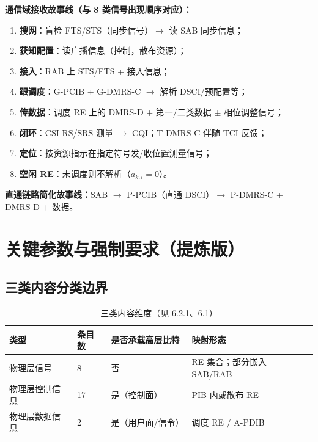 \documentclass[11pt,a4paper]{ctexart}
\begin{document}
\textbf{通信域接收故事线（与 8 类信号出现顺序对应）：}
\begin{enumerate}[nosep]
  \item \textbf{搜网}：盲检 FTS/STS（同步信号）$\rightarrow$ 读 SAB 同步信息；
  \item \textbf{获知配置}：读广播信息（控制，散布资源）；
  \item \textbf{接入}：RAB 上 STS/FTS + 接入信息；
  \item \textbf{跟调度}：G-PCIB + G-DMRS-C $\rightarrow$ 解析 DSCI/预配置等；
  \item \textbf{传数据}：调度 RE 上的 DMRS-D + 第一/二类数据 $\pm$ 相位调整信号；
  \item \textbf{闭环}：CSI-RS/SRS 测量 $\rightarrow$ CQI；T-DMRS-C 伴随 TCI 反馈；
  \item \textbf{定位}：按资源指示在指定符号发/收位置测量信号；
  \item \textbf{空闲 RE}：未调度则不解析（$a_{k,l}{=}0$）。
\end{enumerate}

\textbf{直通链路简化故事线：}SAB $\rightarrow$ P-PCIB（直通 DSCI）$\rightarrow$ P-DMRS-C + DMRS-D + 数据。

\section{关键参数与强制要求（提炼版）}

\subsection{三类内容分类边界}

\begin{table}[h]
\centering
\small
\begin{tabular}{llll}
\toprule
\textbf{类型} & \textbf{条目数} & \textbf{是否承载高层比特} & \textbf{映射形态} \\
\midrule
物理层信号 & 8 & 否 & RE 集合；部分嵌入 SAB/RAB \\
物理层控制信息 & 17 & 是（控制面） & PIB 内或散布 RE \\
物理层数据信息 & 2 & 是（用户面/信令） & 调度 RE / A-PDIB \\
\bottomrule
\end{tabular}
\caption{三类内容维度（见 6.2.1、6.1）}
\end{table}
\end{document}
